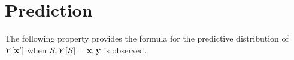 \section{Prediction} \label{sec:prediction}




The following property provides the formula for the predictive distribution of $Y[\mathbf{x}']$ when $S,Y[S]=\mathbf{x},\mathbf{y}$ is observed.

